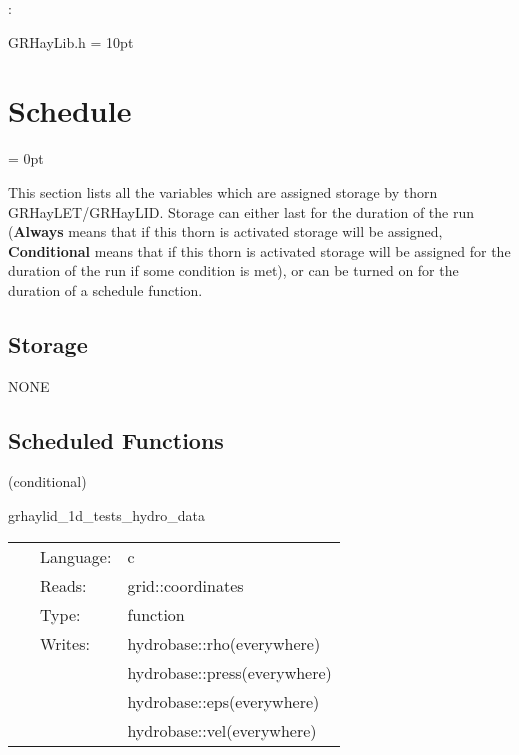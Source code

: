 \documentclass{article}
\begin{document}
\vspace{5mm}

: 

GRHayLib.h
\vspace{2mm}\parskip = 10pt 

\section{Schedule} 


\parskip = 0pt


\noindent This section lists all the variables which are assigned storage by thorn GRHayLET/GRHayLID.  Storage can either last for the duration of the run ({\bf Always} means that if this thorn is activated storage will be assigned, {\bf Conditional} means that if this thorn is activated storage will be assigned for the duration of the run if some condition is met), or can be turned on for the duration of a schedule function.


\subsection*{Storage}NONE
\subsection*{Scheduled Functions}
\vspace{5mm}

   (conditional) 

\hspace{5mm} grhaylid\_1d\_tests\_hydro\_data 

\hspace{5mm}{\it set initial hydrodynamic data for 1d test } 


\hspace{5mm}

 \begin{tabular*}{160mm}{cll} 
~ & Language:  & c \\ 
~ & Reads:  & grid::coordinates \\ 
~ & Type:  & function \\ 
~ & Writes:  & hydrobase::rho(everywhere) \\ 
~& ~ &hydrobase::press(everywhere)\\ 
~& ~ &hydrobase::eps(everywhere)\\ 
~& ~ &hydrobase::vel(everywhere)\\ 
\end{tabular*} 
\end{document}
